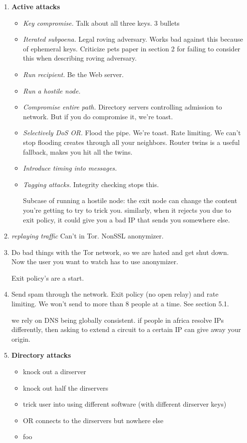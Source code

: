 \documentclass[times,10pt,twocolumn]{article}
\begin{document}
\begin{enumerate}
\item \textbf{Active attacks}
\begin{itemize}
\item \emph{Key compromise.} Talk about all three keys. 3 bullets
\item \emph{Iterated subpoena.} Legal roving adversary. Works bad against
this because of ephemeral keys. Criticize pets paper in section 2 for
failing to consider this when describing roving adversary.
\item \emph{Run recipient.} Be the Web server.
\item \emph{Run a hostile node.} 
\item \emph{Compromise entire path.} Directory servers controlling admission
to network. But if you do compromise it, we're toast.
\item \emph{Selectively DoS OR.} Flood the pipe. We're toast. Rate limiting.
We can't stop flooding creates through all your neighbors. Router twins
is a useful fallback, makes you hit all the twins.
\item \emph{Introduce timing into messages.}
\item \emph{Tagging attacks.}
Integrity checking stops this.

Subcase of running a hostile node: 
the exit node can change the content you're getting to try to
trick you. similarly, when it rejects you due to exit policy,
it could give you a bad IP that sends you somewhere else.
\end{itemize}
\item \emph{replaying traffic} Can't in Tor. NonSSL anonymizer.

\item Do bad things with the Tor network, so we are hated and
get shut down. Now the user you want to watch has to use anonymizer.

Exit policy's are a start.

\item Send spam through the network. Exit policy (no open relay) and
  rate limiting. We won't send to more than 8 people at a time.  See
  section 5.1.

we rely on DNS being globally consistent. if people in africa resolve
IPs differently, then asking to extend a circuit to a certain IP can
give away your origin.

\item \textbf{Directory attacks}
\begin{itemize}
\item knock out a dirserver
\item knock out half the dirservers
\item trick user into using different software (with different dirserver
keys)
\item OR connects to the dirservers but nowhere else
\item foo
\end{itemize}


\end{enumerate}
\end{document}
